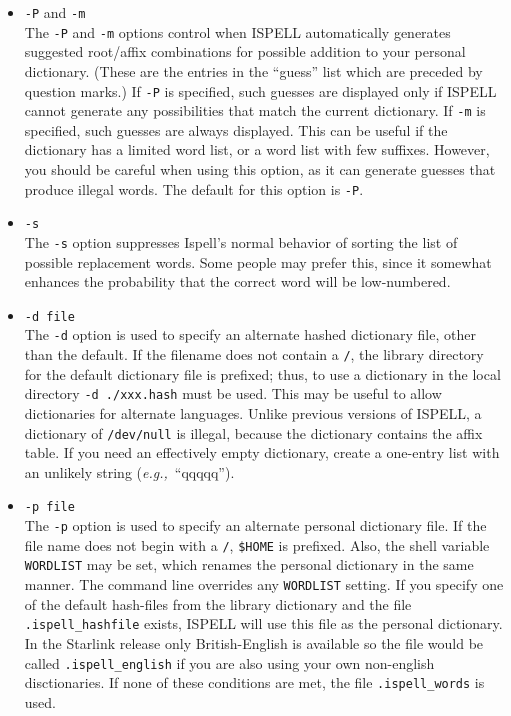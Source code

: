\documentclass[noabs,nolof,twoside,11pt]{starlink}
\begin{document}
\begin{itemize}
\item {\Large\tt -P} and {\Large\tt -m} \\
The \verb+-P+ and \verb+-m+ options control when ISPELL automatically generates
suggested root/affix combinations for possible addition to your personal
dictionary.
(These are the entries in the ``guess'' list which are preceded by question
marks.)
If \verb+-P+ is specified, such guesses are displayed only if ISPELL
cannot generate any possibilities that match the current dictionary.
If \verb+-m+ is specified, such guesses are always displayed.
This can be useful if the dictionary has a limited word list, or a word list
with few suffixes.
However, you should be careful when using this option, as it can generate
guesses that produce illegal words.
The default for this option is \verb+-P+\@.

\item {\Large\tt -s}\\
The \verb+-s+ option suppresses Ispell's normal behavior of sorting the list
of possible replacement words.
Some people may prefer this, since it somewhat enhances the probability that
the correct word will be low-numbered.

\item {\Large\tt -d file}\\
The \verb+-d+ option is used to specify an alternate hashed dictionary file,
other than the default.
If the filename does not contain a \verb+/+, the library directory for the
default dictionary file is prefixed; thus, to use a dictionary in the local
directory \verb+-d ./xxx.hash+ must be used.
This may be useful to allow dictionaries for alternate languages.
Unlike previous versions of ISPELL, a dictionary of \verb+/dev/null+ is illegal,
because the dictionary contains the affix table.
If you need an effectively empty dictionary, create a one-entry list with an
unlikely string ({\it{e.g.,}}~``qqqqq'').

\item {\Large\tt -p file}\\
The \verb+-p+ option is used to specify an alternate personal dictionary file.
If the file name does not begin with a \verb+/+, \verb+$HOME+ is prefixed.
Also, the shell variable \verb+WORDLIST+ may be set, which renames the personal
dictionary in the same manner.
The command line overrides any \verb+WORDLIST+ setting.
If you specify one of the default hash-files from the library dictionary and the
file \verb+.ispell_hashfile+ exists, ISPELL will use this file as the personal
dictionary.
In the Starlink release only British-English is available so the file would be
called \verb+.ispell_english+ if you are also using your own non-english
disctionaries.
If none of these conditions are met, the file \verb+.ispell_words+ is used.


\end{itemize}
\end{document}
